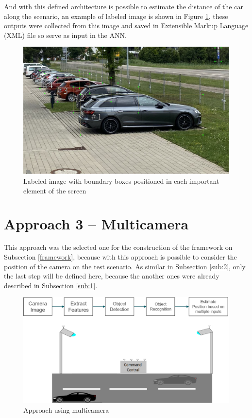 And with this defined architecture is possible to estimate the distance of the car along the scenario, an example of labeled image is shown in Figure \ref{fig:boundary_boxes_car}, these outputs were collected from this image and saved in Extensible Markup Language (XML) file so serve as input in the ANN. 


\begin{figure}[H]
\centering
\includegraphics[width=\textwidth]{imagens/boundary_boxes.JPG}
\caption{Labeled image with boundary boxes positioned in each important element of the screen}
\label{fig:boundary_boxes_car}
\end{figure}




\section{Approach 3 – Multicamera}\label{sub:3}

This approach was the selected one for the construction of the framework on Subsection \ref{framework}, because with this approach is possible to consider the position of the camera on the test scenario. As similar in Subsection \ref{sub:2}, only the last step will be defined here, because the another ones were already described in Subsection \ref{sub:1}. 


\begin{figure}[H]
\centering
\includegraphics[width=\textwidth]{imagens/proposal3.png}
\caption{Approach using multicamera}
\label{fig:proposal3}
\end{figure}

